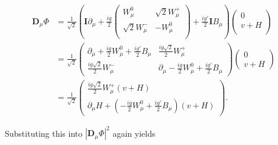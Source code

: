 \documentclass{article}
\begin{document}
\begin{equation}
\begin{split}
\bm{D}_\mu \Phi &= \frac{1}{\sqrt{2}}\left(\bm{I}\partial_\mu+ \frac{ig}{2}\left(\begin{matrix}
W^{0}_\mu & \sqrt{2}W^{+}_\mu \\
\sqrt{2}W^{-}_\mu & -W^{0}_\mu\\
\end{matrix}\right) + \frac{ig'}{2}\bm{I}B_\mu\right)\left(\begin{matrix}
0 \\
v + H\\
\end{matrix}\right) \\
& = \frac{1}{\sqrt{2}}\left(  \begin{matrix}
\partial_\mu + \frac{ig}{2}W^{0}_\mu + \frac{ig'}{2}B_\mu & \frac{ig\sqrt{2}}{2}W^{+}_\mu \\
\frac{ig\sqrt{2}}{2}W^{-}_\mu & \partial_\mu - \frac{ig}{2}W^{0}_\mu + \frac{ig'}{2}B_\mu
\end{matrix}\right)\left(\begin{matrix}
0 \\
v + H
\end{matrix}\right) \\
& = \frac{1}{\sqrt{2}}\left(\begin{matrix}
\frac{ig\sqrt{2}}{2}W^{+}_\mu (v+H)\\
\partial_\mu H + \left(-\frac{ig}{2}W^{0}_\mu  + \frac{ig'}{2}B_\mu\right)(v+H)
\end{matrix}\right).
\end{split}
\end{equation}

Substituting this into $|\bm{D}_\mu\Phi|^2$ again yields
\end{document}
